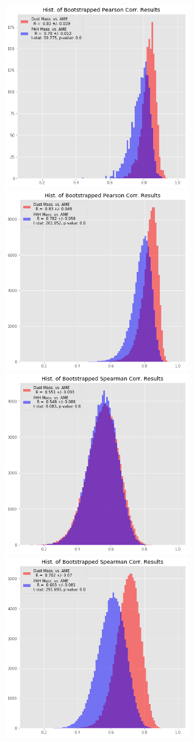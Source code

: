 \documentclass[preprint2,longabstract]{aastex}
\begin{document}
\begin{figure}
\label{fig:AME_boostrap_mass_regs_all}
\includegraphics[width=80mm]{Plots/AMEregs_bootstrap_mass_pearson_PCXV.png}
\includegraphics[width=80mm]{Plots/AMEregs_bootstrap_mass_pearson_PR2.png}
\includegraphics[width=80mm]{Plots/AMEregs_bootstrap_mass_spearman_PR2.png}
\includegraphics[width=80mm]{Plots/AMEregs_bootstrap_mass_spearman_PCXV.png}

\end{figure}
\end{document}
